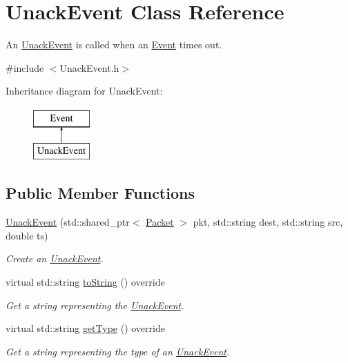 \hypertarget{classUnackEvent}{\section{\-Unack\-Event \-Class \-Reference}
\label{classUnackEvent}
}


\-An \hyperlink{classUnackEvent}{\-Unack\-Event} is called when an \hyperlink{classEvent}{\-Event} times out.  




{\ttfamily \#include $<$\-Unack\-Event.\-h$>$}

\-Inheritance diagram for \-Unack\-Event\-:\begin{figure}[H]
\begin{center}
\leavevmode
\includegraphics[height=2.000000cm]{classUnackEvent}
\end{center}
\end{figure}
\subsection*{\-Public \-Member \-Functions}
\begin{DoxyCompactItemize}
\item 
\hyperlink{classUnackEvent_af9ed3cfe7027d641ceddbd7a2ce560c7}{\-Unack\-Event} (std\-::shared\-\_\-ptr$<$ \hyperlink{classPacket}{\-Packet} $>$ pkt, std\-::string dest, std\-::string src, double ts)
\begin{DoxyCompactList}\small\item\em \-Create an \hyperlink{classUnackEvent}{\-Unack\-Event}. \end{DoxyCompactList}\item 
virtual std\-::string \hyperlink{classUnackEvent_a7be801da20ad826acf9ebfeaa6ee8536}{to\-String} () override
\begin{DoxyCompactList}\small\item\em \-Get a string representing the \hyperlink{classUnackEvent}{\-Unack\-Event}. \end{DoxyCompactList}\item 
virtual std\-::string \hyperlink{classUnackEvent_a56ca06731117d1fff95a1601abed02e8}{get\-Type} () override
\begin{DoxyCompactList}\small\item\em \-Get a string representing the type of an \hyperlink{classUnackEvent}{\-Unack\-Event}. \end{DoxyCompactList}\end{DoxyCompactItemize}
